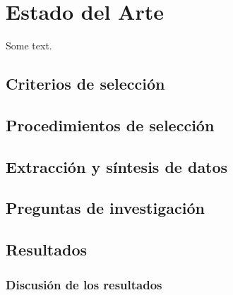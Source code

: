 \section{Estado del Arte}

Some text. 

\subsection{Criterios de selección}

\subsection{Procedimientos de selección}

\subsection{Extracción y síntesis de datos}

\subsection{Preguntas de investigación}

\subsection{Resultados}
\subsubsection{Discusión de los resultados}
